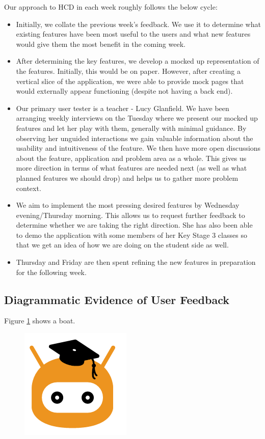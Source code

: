 \documentclass[a4wide, 11pt]{article}
\begin{document}
Our approach to HCD in each week roughly follows the below cycle:
\begin{itemize}
  \item Initially, we collate the previous week's feedback. We use it to determine what existing features have been most useful to the users and what new features would give them the most benefit in the coming week.
  \item After determining the key features, we develop a mocked up representation of the features. Initially, this would be on paper. However, after creating a vertical slice of the application, we were able to provide mock pages that would externally appear functioning (despite not having a back end).
  \item Our primary user tester is a teacher - Lucy Glanfield. We have been arranging weekly interviews on the Tuesday where we present our mocked up features and let her play with them, generally with minimal guidance. By observing her unguided interactions we gain valuable information about the usability and intuitiveness of the feature. We then have more open discussions about the feature, application and problem area as a whole. This gives us more direction in terms of what features are needed next (as well as what planned features we should drop) and helps us to gather more problem context.
  \item We aim to implement the most pressing desired features by Wednesday evening/Thursday morning. This allows us to request further feedback to determine whether we are taking the right direction. She has also been able to demo the application with some members of her Key Stage 3 classes so that we get an idea of how we are doing on the student side as well.
  \item Thursday and Friday are then spent refining the new features in preparation for the following week.
\end{itemize}

\subsection{Diagrammatic Evidence of User Feedback}

Figure \ref{fig:mockup} shows a boat.

\begin{figure}
  \begin{center}
  \includegraphics[]{placeholder.png}
  \end{center}
  \label{fig:mockup}
\end{figure}
\end{document}
